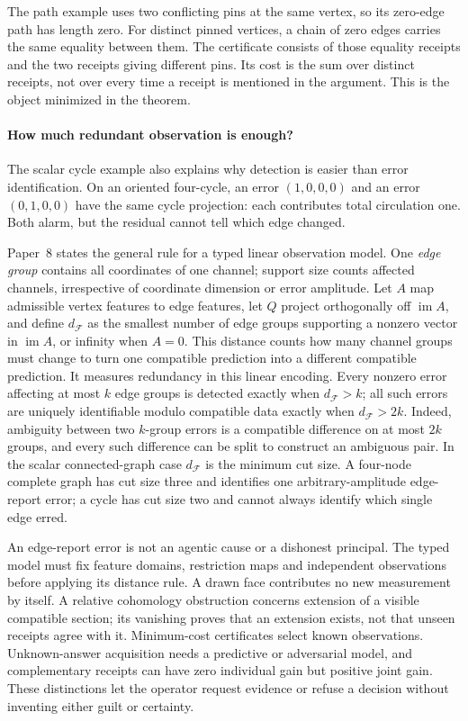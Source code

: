 \documentclass[11pt,a4paper]{article}
\theoremstyle{definition}
\theoremstyle{remark}
\begin{document}
The path example uses two conflicting pins at the same vertex, so its
zero-edge path has length zero. For distinct pinned vertices, a chain of
zero edges carries the same equality between them. The certificate consists
of those equality receipts and the two receipts giving different pins.
Its cost is the sum over distinct receipts, not over every time a receipt
is mentioned in the argument. This is the object minimized in the theorem.

\paragraph{How much redundant observation is enough?}
The scalar cycle example also explains why detection is easier than error
identification. On an oriented four-cycle, an error $(1,0,0,0)$ and an error
$(0,1,0,0)$ have the same cycle projection: each contributes total circulation
one. Both alarm, but the residual cannot tell which edge changed.

Paper~8 states the general rule for a typed linear observation model. One
\emph{edge group} contains all coordinates of one channel; support size counts
affected channels, irrespective of coordinate dimension or error amplitude. Let
$A$ map admissible vertex features to edge features, let $Q$ project
orthogonally off $\operatorname{im}A$, and define $d_{\mathcal F}$ as the
smallest number of edge groups supporting a nonzero vector in
$\operatorname{im}A$, or infinity when $A=0$. This distance counts how many channel groups must
change to turn one compatible prediction into a different compatible
prediction. It measures redundancy in this linear encoding. Every nonzero error affecting at
most $k$ edge groups is detected exactly when $d_{\mathcal F}>k$; all such
errors are uniquely identifiable modulo compatible data exactly when
$d_{\mathcal F}>2k$. Indeed, ambiguity between two $k$-group errors is a
compatible difference on at most $2k$ groups, and every such difference can
be split to construct an ambiguous pair. In the scalar connected-graph case
$d_{\mathcal F}$ is the minimum cut size. A four-node complete graph has cut
size three and identifies one arbitrary-amplitude edge-report error; a cycle
has cut size two and cannot always identify which single edge erred.

\begin{pdboundary}
An edge-report error is not an agentic cause or a dishonest principal. The
typed model must fix feature domains, restriction maps and independent
observations before applying its distance rule. A drawn face contributes no
new measurement by itself. A relative cohomology obstruction concerns extension
of a visible \mbox{compatible} section; its vanishing proves that an extension exists,
not that unseen receipts agree with it. Minimum-cost certificates select known
observations. Unknown-answer acquisition needs a predictive or adversarial
model, and complementary receipts can have zero individual gain but positive
joint gain. These distinctions let the operator request evidence or refuse a
decision without inventing either guilt or certainty.
\end{pdboundary}
\end{document}
